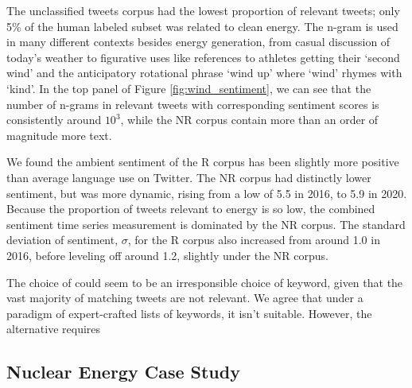 \todo{}
The unclassified  tweets corpus had the lowest proportion of relevant tweets;
only 5\% of the human labeled subset was related to clean energy.
The n-gram  is used in many different contexts besides energy generation,
from casual discussion of today's weather to figurative uses like references to athletes getting their `second wind' and the anticipatory rotational phrase `wind up' where `wind' rhymes with `kind'. In the top panel of Figure \ref{fig:wind_sentiment}, we can see that the number of n-grams in relevant tweets with corresponding sentiment scores is consistently around $10^3$, while the NR corpus contain more than an order of magnitude more text.

We found the ambient sentiment of the R  corpus has been slightly more positive than average language use on Twitter. 
The NR corpus had distinctly lower sentiment, but was more dynamic, rising from a low of 5.5 in 2016, to 5.9 in 2020.
Because the proportion of tweets relevant to energy is so low, 
the combined sentiment time series measurement is dominated by the NR corpus. 
The standard deviation of sentiment, $\sigma$, for the R corpus also increased from around 1.0 in 2016, before leveling off around 1.2, slightly under the NR corpus.




The choice of  could seem to be an irresponsible choice of keyword, 
given that the vast majority of matching tweets are not relevant. We agree that under a paradigm  of expert-crafted lists of keywords, it isn't suitable. However, the alternative requires 

\subsection{ Nuclear Energy Case Study}

